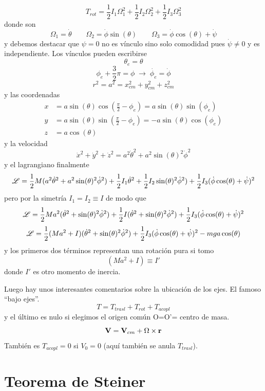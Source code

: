 \documentclass[10pt,oneside]{CBFT_book}
\begin{document}
\[
	T_{rot} = \frac{1}{2} I_1 \Omega^2_ 1 + \frac{1}{2} I_2 \Omega^2_2 + \frac{1}{2} I_3 \Omega^2_3 
\]
donde son 
\[
	\Omega_1 = \dot{\theta} \qquad \Omega_2 = \dot{\phi} \sin(\theta) \qquad \Omega_3 = \dot{\phi} \cos(\theta) + \dot{\psi}
\]
y debemos destacar que $\psi=0$ no es vínculo sino solo comodidad pues $\dot{\psi} \neq 0$ y es independiente.
Los vínculos pueden escribirse
\[
	\theta_e = \theta
\]
\[
	\phi_e + \frac{3}{2}\pi = \phi \; \longrightarrow \; \dot{\phi_e} = \dot{\phi}
\]
\[
	r^2 = a^2 = x_{cm}^2 + y_{cm}^2 + z_{cm}^2
\]
y las coordenadas
\begin{align*}
	x &= a \sin(\theta) \cos\left( \frac{\pi}{2}-\phi_e \right) = a \sin(\theta) \sin( \phi_e ) \\
	y &= a \sin(\theta) \sin\left( \frac{\pi}{2}-\phi_e \right) = -a \sin(\theta) \cos( \phi_e ) \\
	z &= a \cos(\theta)
\end{align*}
y la velocidad
\[
	\dot{x}^2 + \dot{y}^2 + \dot{z}^2 = a^2 \dot{\theta}^2 + a^2 \sin(\theta)^2 \dot{\phi}^2
\]
y el lagrangiano finalmente
\[
	\mathscr{L} = \frac{1}{2} M (a^2 \dot{\theta}^2 + a^2 \sin(\theta)^2 \dot{\phi}^2) + \frac{1}{2} I_1 \dot{\theta}^2
	+ \frac{1}{2} I_2 \sin(\theta)^2 \dot{\phi}^2) + \frac{1}{2} I_3 (\dot{\phi} \cos(\theta) + \dot{\psi})^2 
\]
pero por la simetría $I_1=I_2\equiv I$ de modo que 
\[
	\mathscr{L} = \frac{1}{2} M a^2 (\dot{\theta}^2 + \sin(\theta)^2 \dot{\phi}^2) + \frac{1}{2} I ( \dot{\theta}^2 +
	\sin(\theta)^2 \dot{\phi}^2 ) + \frac{1}{2} I_3 (\dot{\phi} \cos(\theta) + \dot{\psi})^2 
\]
\[
	\mathscr{L} = \frac{1}{2} ( M a^2 + I ) (\dot{\theta}^2 + \sin(\theta)^2 \dot{\phi}^2) +  
		\frac{1}{2} I_3 (\dot{\phi} \cos(\theta) + \dot{\psi})^2  - m g a \cos(\theta)
\]
y los primeros dos términos representan una rotación pura si tomo 
\[
	( M a^2 + I ) \equiv I' 
\]
donde $I'$ es otro momento de inercia.

Luego hay unos interesantes comentarios sobre la ubicación de los ejes. El famoso ``bajo ejes''.
\[
	T = T_{trasl} + T_{rot} + T_{acopl}
\]
y el último es nulo si elegimos el origen común O=O'= centro de masa.
\[
	\vb{V} = \vb{V}_{cm} + \Omega \times \vb{r}
\]
También es $T_{acopl}=0$ si $V_0=0$ (aquí también se anula $T_{trasl}$).

\section{Teorema de Steiner}
\end{document}
